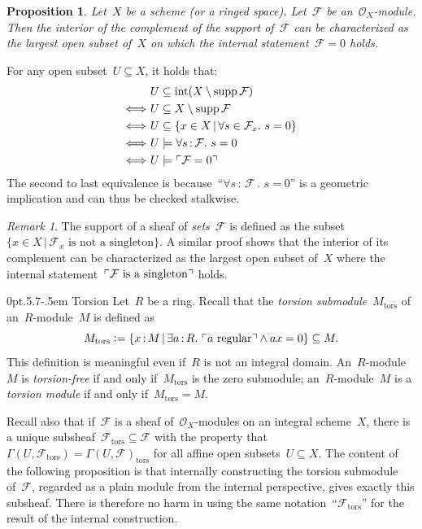 \documentclass[10pt,reqno,a4paper]{amsbook}
\makeatletter
\theoremstyle{definition}
\theoremstyle{plain}
\newtheorem{prop}[defn]{Proposition}
\theoremstyle{remark}
\newtheorem{rem}[defn]{Remark}
\newcommand{\F}{\mathcal{F}}
\renewcommand{\O}{\mathcal{O}}
\newcommand{\tors}{\mathrm{tors}}
\DeclareMathOperator{\Int}{int}
\DeclareMathOperator{\supp}{supp}
\newcommand{\?}{\,{:}\,}
\renewcommand{\_}{\mathpunct{.}\,}
\newcommand{\speak}[1]{\ulcorner\text{\textnormal{#1}}\urcorner}
\newcommand{\defeq}{\vcentcolon=}
\renewenvironment{proof}[1][\proofname]{\par
  \pushQED{\qed}%
  \normalfont \topsep6\p@\@plus6\p@\relax
  \trivlist
  \item[\hskip\labelsep
        \itshape
    #1\@addpunct{.}]\ignorespaces
}{%
  \popQED\endtrivlist\@endpefalse
}
\def\subsection{\@startsection{subsection}{2}%
  {0pt}{.5\linespacing\@plus.7\linespacing}{-.5em}%
  {\normalfont\bfseries}}
\makeatother
\begin{document}
\begin{prop}\label{prop:characterization-support}
Let~$X$ be a scheme (or a ringed space). Let~$\F$ be
an~$\O_X$-module. Then the interior of the complement of the support of~$\F$
can be characterized as the largest open subset of~$X$ on which the internal
statement~$\F = 0$ holds.
\end{prop}
\begin{proof}
For any open subset~$U \subseteq X$, it holds that:
\begin{align*}
  &\ U \subseteq \Int(X \setminus \supp \F) \\
  \Longleftrightarrow&\ U \subseteq X \setminus \supp \F \\
  \Longleftrightarrow&\ U \subseteq \{ x \in X \,|\, \forall s \in \F_x\_ s = 0 \} \\
  \Longleftrightarrow&\ U \models \forall s\?\F\_ s = 0 \\
  \Longleftrightarrow&\ U \models \speak{$\F = 0$}
\end{align*}
The second to last equivalence is because~``$\forall s\?\F\_ s = 0$'' is a
geometric implication and can thus be checked stalkwise.
\end{proof}

\begin{rem}\label{rem:support-sheaf-of-sets}
The support of a sheaf of \emph{sets}~$\F$ is defined as the subset~$\{ x \in X \,|\,
\text{$\F_x$ is not a singleton} \}$. A similar proof shows that the interior
of its complement can be characterized as the largest open subset of~$X$ where
the internal statement~$\speak{$\F$ is a singleton}$ holds.\end{rem}


\subsection{Torsion} Let~$R$ be a ring. Recall that the
\emph{torsion submodule}~$M_\tors$ of an~$R$-module~$M$ is defined as
\[ M_\tors \defeq \{ x\?M \,|\, \exists a\?R\_ \speak{$a$ regular} \wedge ax = 0 \}
\subseteq M. \]
This definition is meaningful even if~$R$ is not an integral domain.
An~$R$-module~$M$ is \emph{torsion-free} if and only if~$M_\tors$ is
the zero submodule; an~$R$-module~$M$ is a \emph{torsion module} if and only
if~$M_\tors = M$.

Recall also that if~$\F$ is a sheaf of~$\O_X$-modules on an integral
scheme~$X$, there is a unique subsheaf~$\F_\tors \subseteq \F$ with the
property that~$\Gamma(U,\F_\tors) = \Gamma(U,\F)_\tors$ for all affine open
subsets~$U \subseteq X$. The content of the following proposition is that
internally constructing the torsion submodule of~$\F$, regarded as a plain
module from the internal perspective, gives exactly this subsheaf. There is
therefore no harm in using the same notation~``$\F_\tors$'' for the result of
the internal construction.
\end{document}
